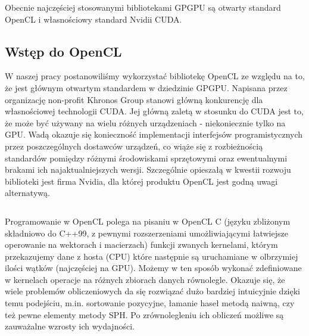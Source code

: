 \documentclass[polish, 12pt]{aghthesis}
\begin{document}
			$\,$		

			Obecnie najczęściej stosowanymi bibliotekami GPGPU są otwarty standard OpenCL i własnościowy standard Nvidii CUDA.
		
		\subsection{Wstęp do OpenCL}
			W naszej pracy postanowiliśmy wykorzystać bibliotekę OpenCL ze względu na to, że jest głównym otwartym standardem w dziedzinie GPGPU. Napisana przez organizację non-profit Khronos Group stanowi główną konkurencję dla własnościowej technologii CUDA. Jej główną zaletą w stosunku do CUDA jest to, że może być używany na wielu różnych urządzeniach - niekoniecznie tylko na GPU. Wadą okazuje się konieczność implementacji interfejsów programistycznych przez poszczególnych dostawców urządzeń, co wiąże się z rozbieżnością standardów pomiędzy różnymi środowiskami sprzętowymi oraz ewentualnymi brakami ich najaktualniejszych wersji. Szczególnie opieszałą w kwestii rozwoju biblioteki jest firma Nvidia, dla której produktu OpenCL jest godną uwagi alternatywą.
			
			$\,$		

			Programowanie w OpenCL polega na pisaniu w OpenCL C (języku zbliżonym składniowo do C++99, z pewnymi rozszerzeniami umożliwiającymi łatwiejsze operowanie na wektorach i macierzach) funkcji zwanych kernelami, którym przekazujemy dane z hosta (CPU) które następnie są uruchamiane w olbrzymiej ilości wątków (najczęściej na GPU). Możemy w ten sposób wykonać zdefiniowane w kernelach operacje na różnych zbiorach danych równolegle. Okazuje się, że wiele problemów obliczeniowych da się rozwiązać dużo bardziej intuicyjnie dzięki temu podejściu, m.in. sortowanie pozycyjne, łamanie haseł metodą naiwną, czy też pewne elementy metody SPH. Po zrównolegleniu ich obliczeń możliwe są zauważalne wzrosty ich wydajności.
			
			$\,$		
			
\end{document}
